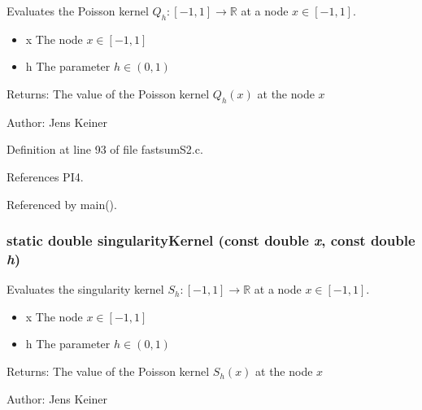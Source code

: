 Evaluates the Poisson kernel $Q_h: [-1,1] \rightarrow \mathbb{R}$ at a node $x \in [-1,1]$. 

\begin{itemize}
\item x The node $x \in [-1,1]$ \item h The parameter $h \in (0,1)$\end{itemize}
\begin{Desc}
\item[Returns:]The value of the Poisson kernel $Q_h(x)$ at the node $x$\end{Desc}
\begin{Desc}
\item[Author:]Jens Keiner \end{Desc}


Definition at line 93 of file fastsumS2.c.

References PI4.

Referenced by main().\hypertarget{group__applications__fastsumS2__test_g3f82140c739f6fcf9bc17a03a09f580d}{
\subsubsection{\setlength{\rightskip}{0pt plus 5cm}static double singularityKernel (const double {\em x}, const double {\em h})}}
\label{group__applications__fastsumS2__test_g3f82140c739f6fcf9bc17a03a09f580d}


Evaluates the singularity kernel $S_h: [-1,1] \rightarrow \mathbb{R}$ at a node $x \in [-1,1]$. 

\begin{itemize}
\item x The node $x \in [-1,1]$ \item h The parameter $h \in (0,1)$\end{itemize}
\begin{Desc}
\item[Returns:]The value of the Poisson kernel $S_h(x)$ at the node $x$\end{Desc}
\begin{Desc}
\item[Author:]Jens Keiner \end{Desc}


